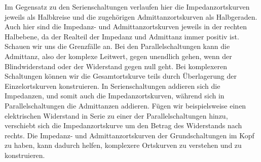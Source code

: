 {\begin{frame}
{Im Gegensatz zu den Serienschaltungen verlaufen hier die Impedanzortskurven jeweils als Halbkreise und die zugehörigen Admittanzortskurven als Halbgeraden.
Auch hier sind die Impedanz- und Admittanzortskurven jeweils in der rechten Halbebene, da der Realteil der Impedanz und Admittanz immer positiv ist.
Schauen wir uns die Grenzfälle an. Bei den Parallelschaltungen kann die Admittanz, also der komplexe Leitwert, gegen unendlich gehen, 
wenn der Blindwiderstand oder der Widerstand gegen null geht.
Bei komplexeren Schaltungen können wir die Gesamtortskurve teils durch Überlagerung der Einzelortskurven konstruieren.
In Serienschaltungen addieren sich die Impedanzen, und somit auch die Impedanzortskurven, während sich in Parallelschaltungen die Admittanzen addieren.
Fügen wir beispielsweise einen elektrischen Widerstand in Serie zu einer der Parallelschaltungen hinzu, verschiebt sich die Impedanzortskurve um den Betrag des Widerstands nach rechts.
Die Impedanz- und Admittanzortskurven der Grundschaltungen im Kopf zu haben, kann dadurch helfen, komplexere Ortskurven zu verstehen und zu konstruieren.
}%
\end{frame}
}%